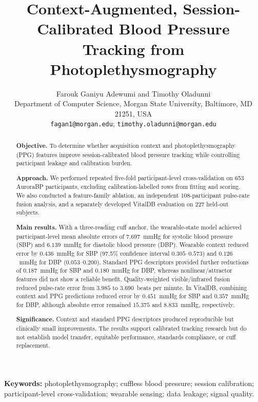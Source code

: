\documentclass[12pt]{article}
\begin{document}
\onehalfspacing
\title{Context-Augmented, Session-Calibrated Blood Pressure Tracking from Photoplethysmography}
\author{Farouk Ganiyu Adewumi and Timothy Oladunni\\
\normalsize Department of Computer Science, Morgan State University, Baltimore, MD 21251, USA\\
\normalsize \texttt{fagan1@morgan.edu}; \texttt{timothy.oladunni@morgan.edu}}
\date{}
\maketitle
\begin{abstract}
\textbf{Objective.} To determine whether acquisition context and photoplethysmography (PPG) features improve session-calibrated blood pressure tracking while controlling participant leakage and calibration burden.

\textbf{Approach.} We performed repeated five-fold participant-level cross-validation on 653 AuroraBP participants, excluding calibration-labelled rows from fitting and scoring. We also conducted a feature-family ablation, an independent 108-participant pulse-rate fusion analysis, and a separately developed VitalDB evaluation on 227 held-out subjects.

\textbf{Main results.} With a three-reading cuff anchor, the wearable-state model achieved participant-level mean absolute errors of $7.697$~mmHg for systolic blood pressure (SBP) and $6.139$~mmHg for diastolic blood pressure (DBP). Wearable context reduced error by $0.436$~mmHg for SBP (97.5\% confidence interval $0.305$--$0.573$) and $0.126$~mmHg for DBP ($0.053$--$0.200$). Standard PPG descriptors provided further reductions of $0.187$~mmHg for SBP and $0.180$~mmHg for DBP, whereas nonlinear/attractor features did not show a reliable benefit. Quality-weighted visible/infrared fusion reduced pulse-rate error from $3.985$ to $3.690$~beats per minute. In VitalDB, combining context and PPG predictions reduced error by $0.451$~mmHg for SBP and $0.357$~mmHg for DBP, although absolute error remained $15.375$ and $8.833$~mmHg, respectively.

\textbf{Significance.} Context and standard PPG descriptors produced reproducible but clinically small improvements. The results support calibrated tracking research but do not establish model transfer, equitable performance, standards compliance, or cuff replacement.
\end{abstract}
\noindent\textbf{Keywords:} photoplethysmography; cuffless blood pressure; session calibration; participant-level cross-validation; wearable sensing; data leakage; signal quality.
\end{document}
